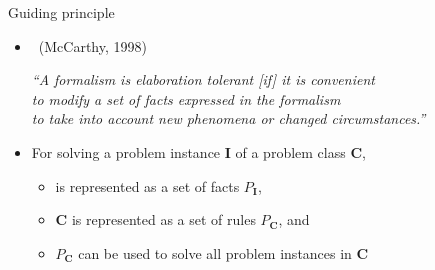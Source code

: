 \begin{frame}{Guiding principle}
  \bigskip
  \begin{itemize}
  \item<1->  \ (McCarthy, 1998)
    \medskip

    {\itshape
    ``A formalism is \alert<1>{elaboration tolerant} \textnormal{[if]} it is convenient
    \\\hspace{2pt} to modify a set of facts expressed in the formalism
    \\\hspace{2pt} to take into account new phenomena or changed circumstances.''
    }

    \bigskip
  \item<2-> 
    \medskip

    For solving a problem instance \textbf{I} of a problem class \textbf{C},
    \begin{itemize}
    \item {} is represented as a set of facts $P_{\textbf{I}}$,
    \item \textbf{C} is represented as a set of rules $P_{\textbf{C}}$, and
      \medskip
    \item $P_{\textbf{C}}$ can be used to solve all problem instances in \textbf{C}
    \end{itemize}
  \end{itemize}
\end{frame}
%
